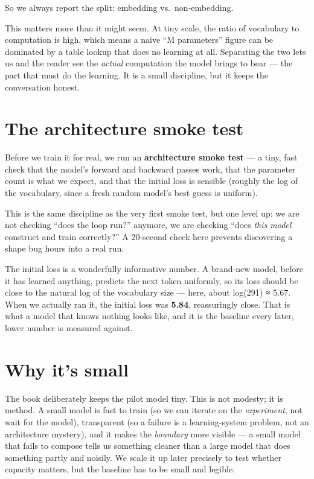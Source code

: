 So we always report the split: embedding vs.~non-embedding.

This matters more than it might seem. At tiny scale, the ratio of
vocabulary to computation is high, which means a naive ``M parameters''
figure can be dominated by a table lookup that does no learning at all.
Separating the two lets us and the reader see the \emph{actual}
computation the model brings to bear --- the part that must do the
learning. It is a small discipline, but it keeps the conversation
honest.

\section{The architecture smoke test}\label{the-architecture-smoke-test}

Before we train it for real, we run an \textbf{architecture smoke test}
--- a tiny, fast check that the model's forward and backward passes
work, that the parameter count is what we expect, and that the initial
loss is sensible (roughly the log of the vocabulary, since a fresh
random model's best guess is uniform).

This is the same discipline as the very first smoke test, but one level
up: we are not checking ``does the loop run?'' anymore, we are checking
``does \emph{this model} construct and train correctly?'' A 20-second
check here prevents discovering a shape bug hours into a real run.

The initial loss is a wonderfully informative number. A brand-new model,
before it has learned anything, predicts the next token uniformly, so
its loss should be close to the natural log of the vocabulary size ---
here, about log(291) ≈ 5.67. When we actually ran it, the initial loss
was \textbf{5.84}, reassuringly close. That is what a model that knows
nothing looks like, and it is the baseline every later, lower number is
measured against.

\section{Why it's small}\label{why-its-small}

The book deliberately keeps the pilot model tiny. This is not modesty;
it is method. A small model is fast to train (so we can iterate on the
\emph{experiment}, not wait for the model), transparent (so a failure is
a learning-system problem, not an architecture mystery), and it makes
the \emph{boundary} more visible --- a small model that fails to compose
tells us something cleaner than a large model that does something partly
and noisily. We scale it up later precisely to test whether capacity
matters, but the baseline has to be small and legible.

